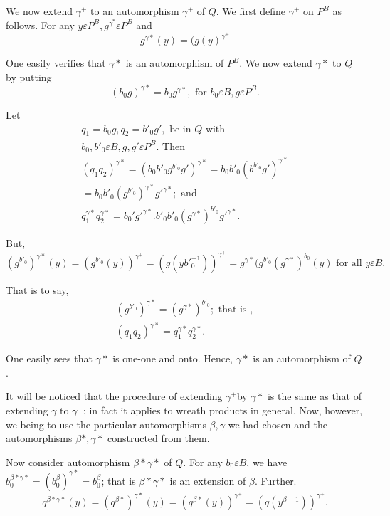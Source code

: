 We now extend ${\gamma^{+}}$ to an automorphism ${\gamma^{+}}$ of
$Q$. We first define ${\gamma^{+}}$ on $P^B$ as follows. For any $y
\varepsilon P^B, g^{\gamma^{*}} \varepsilon P^B$ and  
$$
g^{\gamma*} (y) = (g(y)^{\gamma^{+}}
$$

One easily verifies that ${\gamma*}$ is an automorphism of $P^B$. We
now extend ${\gamma*}$ to $Q$ by putting 
$$
(b_0g)^{\gamma*} = b_0 g^{\gamma*}, \text{ for } b_0 \varepsilon B, g
\varepsilon P^B. 
$$

Let 
\begin{gather*}
  q_1 = b_0 g, q_2 = b'_0 g', \text{ be in } Q \text{ with }\\
  b_0, b'_0 \varepsilon B, g,g' \varepsilon P^B. \text{ Then }\\
  (q_1 q_2)^{\gamma*} = (b_0 b'_0 g^{b'_{0}} g')^{\gamma*} = b_0 b'_0
  (b^{b'_0} g')^{\gamma*}\\ 
  = b_0 b'_0 (g^{b'_0})^{\gamma*} g'^{\gamma*}; \text{ and }\\
  q_1^{\gamma*} q_2^{\gamma*} = b_0' g'^{\gamma*}. b'_0 b'_0 (g^{\gamma*})^
  {b'_0} g'^{\gamma*}.
\end{gather*}

But,
$$
(g^{b'_0})^{\gamma*}(y) = (g^{b'_0}(y))^{\gamma^{+}} =
(g(yb'^{-1}_0))^{\gamma^{+}} = g^{\gamma*}
(g^{b'_0}(g^{\gamma*})^{b_0} (y) \text{ for all } y \varepsilon B. 
$$

That is to say,
\begin{gather*}
  (g^{b'_0})^{\gamma*} = (g^{\gamma*})^{b'_0}; \text{ that is },\\
  (q_1 q_2)^{\gamma*} = q_1^{\gamma*} q_2^{\gamma*}.
\end{gather*}

One easily sees that ${\gamma*}$ is one-one and onto. Hence,
${\gamma*}$ is   an automorphism of $Q$. 

It will be noticed that the procedure of extending ${\gamma^{+}}$by
${\gamma*}$ is the same as that of extending ${\gamma}$ to
${\gamma^{+}}$; in fact it applies to wreath products in general. Now,
however, we being to use the particular automorphisms $\beta,
{\gamma}$ we had chosen and the automorphisms $\beta*,  {\gamma*}$
constructed from them. 

Now consider automorphism $\beta*  {\gamma*}$ of $Q$. For any $b_0
\varepsilon B$, we have $b^{\beta*  {\gamma*}}_0 =
(b^{\beta}_0)^{\gamma*} = b^{\beta}_0$; that is $\beta*  {\gamma*}$ is
an extension of $\beta$. Further. 
$$
q^{\beta*  {\gamma*}} (y) = \left(q^{\beta* }\right)^{{\gamma*}} (y) =
\left(q^{\beta*}(y)\right)^{\gamma^{+}} = \left(q(y^{\beta -1})\right)^{\gamma^{+}}. 
$$

